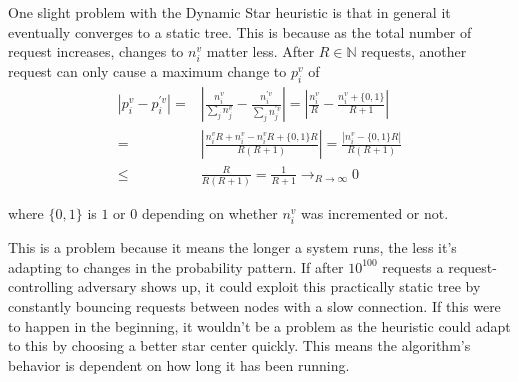 \documentclass[a4paper, oneside]{discothesis}
\begin{document}
One slight problem with the Dynamic Star heuristic is that in general it eventually converges to a static tree. This is because as the total number of request increases, changes to $n_i^v$ matter less. After $R\in\mathbb{N}$ requests, another request can only cause a maximum change to $p_i^v$ of
\begin{equation}
\begin{split}
\left|p_i^v-p_i^{'v}\right| = & \left|\frac{n_i^v}{\sum_jn_j^v}-\frac{n_i^{'v}}{\sum_jn_j^{'v}}\right| = \left|\frac{n_i^v}{R}-\frac{n_i^v+\{0,1\}}{R+1}\right| \\
= & \left|\frac{n_i^vR+n_i^v-n_i^vR+\{0,1\}R}{R(R+1)}\right| = \frac{\left|n_i^v-\{0,1\}R\right|}{R(R+1)} \\
\leq & \frac{R}{R(R+1)}=\frac{1}{R+1}\to_{R\to\infty} 0
\end{split}
\end{equation}

where $\{0,1\}$ is $1$ or $0$ depending on whether $n_i^v$ was incremented or not.

This is a problem because it means the longer a system runs, the less it's adapting to changes in the probability pattern. If after $10^{100}$ requests a request-controlling adversary shows up, it could exploit this practically static tree by constantly bouncing requests between nodes with a slow connection. If this were to happen in the beginning, it wouldn't be a problem as the heuristic could adapt to this by choosing a better star center quickly. This means the algorithm's behavior is dependent on how long it has been running.
\end{document}
